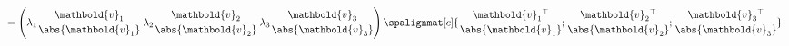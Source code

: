 \documentclass[dvipdfmx,titlepage, 11pt, a4paper]{jsarticle}%
\begin{document}
\begin{enumerate}[(1)]
\begin{align*}
			& = \left(
				\lambda_1\cfrac{\mathbold{v}_1}{\abs{\mathbold{v}_1}}\;
				\lambda_2\cfrac{\mathbold{v}_2}{\abs{\mathbold{v}_2}}\;
				\lambda_3\cfrac{\mathbold{v}_3}{\abs{\mathbold{v}_3}}
			\right)
			\spalignmat[c]{
			{\cfrac{\mathbold{v}_1{}^{\top}}{\abs{\mathbold{v}_1}}};
			{\cfrac{\mathbold{v}_2{}^{\top}}{\abs{\mathbold{v}_2}}};
			{\cfrac{\mathbold{v}_3{}^{\top}}{\abs{\mathbold{v}_3}}}
			}\\

\end{align*}
\end{enumerate}
\end{document}
